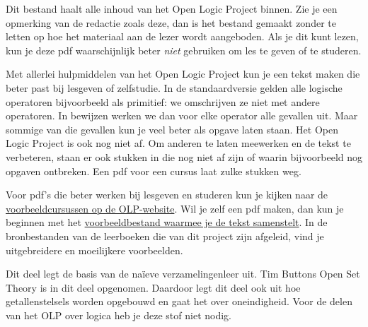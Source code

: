 \documentclass[openany]{memoir}
\begin{document}
\clearpage

\begin{editorial}
Dit bestand haalt alle inhoud van het Open Logic Project binnen. Zie je een
opmerking van de redactie zoals deze, dan is het bestand gemaakt zonder te
letten op hoe het materiaal aan de lezer wordt aangeboden. Als je dit kunt
lezen, kun je deze pdf waarschijnlijk beter \emph{niet} gebruiken om les te
geven of te studeren.

Met allerlei hulpmiddelen van het Open Logic Project kun je een tekst maken die
beter past bij lesgeven of zelfstudie. In de standaardversie gelden alle logische
operatoren bijvoorbeeld als primitief: we omschrijven ze niet met andere
operatoren. In bewijzen werken we dan voor elke operator alle gevallen uit.
Maar sommige van die gevallen kun je veel beter als opgave laten staan. Het Open
Logic Project is ook nog niet af. Om anderen te laten meewerken en de tekst te
verbeteren, staan er ook stukken in die nog niet af zijn of waarin bijvoorbeeld
nog opgaven ontbreken. Een pdf voor een cursus laat zulke
stukken weg.

Voor pdf's die beter werken bij lesgeven en studeren kun je kijken naar de
\href{http://builds.openlogicproject.org/}{voorbeeldcursussen op de
  OLP-website}. Wil je zelf een pdf maken, dan kun je beginnen met het
\href{https://github.com/OpenLogicProject/OpenLogic/tree/master/courses/sample}{voorbeeldbestand
  waarmee je de tekst samenstelt}. In de bronbestanden van de leerboeken die van
dit project zijn afgeleid, vind je uitgebreidere en moeilijkere voorbeelden.
\end{editorial}
\endgroup

\begingroup
\def\olfilename{OLP-0003}
\def\olfilepath{content/sets-functions-relations/}
\hypertarget{unit-OLP-0003}{}




\begin{editorial}
  Dit deel legt de basis van de naïeve verzamelingenleer uit. Tim Buttons
  Open Set Theory is in dit deel opgenomen. Daardoor legt dit deel ook uit hoe
  getallenstelsels worden opgebouwd en gaat het over oneindigheid. Voor de
  delen van het OLP over logica heb je deze stof niet nodig.
\end{editorial}
\endgroup
\end{document}
